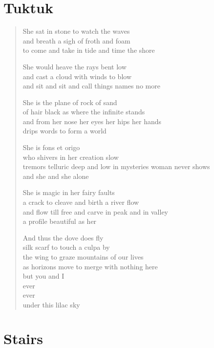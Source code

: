 \documentclass[ebook, 10pt, openright, onecolumn]{memoir}
\newenvironment{poetry}
{
  \begin{quote}
    \begin{itshape}
      \small
    }
    {
    \end{itshape}
  \end{quote}
}
\begin{document}
\chapter{Tuktuk}
\label{cha:tuktuk}

\begin{poetry}
  She sat in stone to watch the waves\\
  and breath a sigh of froth and foam\\
  to come and take in tide and time the shore

  She would heave the rays bent low\\
  and cast a cloud with winds to blow\\
  and sit and sit and call things names no more

  She is the plane of rock of sand\\
  of hair black as where the infinite stands\\
  and from her nose her eyes her hips her hands\\
  drips words to form a world

  She is fons et origo\\
  who shivers in her creation slow\\
  tremors telluric deep and low in mysteries woman never shows\\
  and she and she alone

  She is magic in her fairy faults\\
  a crack to cleave and birth a river flow\\
  and flow till free and carve in peak and in valley\\
  a profile beautiful as her

  And thus the dove does fly\\
  silk scarf to touch a culpa by\\
  the wing to graze mountains of our lives\\
  as horizons move to merge with nothing here\\

  but you and I\\
  ever\\
  ever\\
  under this lilac sky\\
\end{poetry}

\chapter{Stairs}
\label{cha:stairs}
\end{document}
